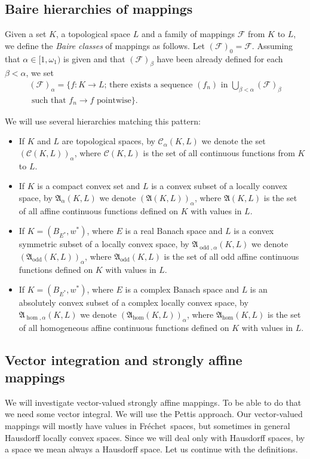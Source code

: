 \documentclass{amsart}
\numberwithin{equation}{section}
\theoremstyle{definition}
\def\fra{\mathfrak{A}}
\def\C{\mathcal C}
\def\F{\mathcal F}
\def\hom{\operatorname{hom}}
\def\odd{\operatorname{odd}}
\newcommand{\setsep}{;\,}
\newcommand{\fr}{Fr\'echet\ }
\begin{document}
\subsection{Baire hierarchies of mappings}\label{ssec:baire}

Given a set $K$, a topological space $L$ and a family of mappings $\F$ from $K$ to $L$, we define the \emph{Baire classes} of mappings as follows. Let $(\F)_0=\F$. Assuming  that $\alpha\in [1,\omega_1)$ is given and that $(\F)_\beta$ have
been already defined for each $\beta<\alpha$, we set
\begin{multline*}
(\F)_\alpha=\{f\colon K\to L\setsep \text{there exists a sequence } (f_n)\text{ in }\bigcup_{\beta<\alpha} (\F)_\beta
\\ \text{ such that }f_n\to f
\mbox{ pointwise}\}.
\end{multline*}

We will use several hierarchies matching this pattern:
\begin{itemize}
	\item If $K$ and $L$ are topological spaces, by $\C_\alpha(K,L)$ we denote the set $(\C(K,L))_\alpha$, where $\C(K,L)$ is the set of all continuous functions from $K$ to $L$.
	\item If $K$ is a compact convex set and $L$ is a convex subset of a locally convex space, by $\fra_\alpha(K,L)$ we denote $(\fra(K,L))_\alpha$, where $\fra(K,L)$ is the set of all affine continuous functions defined on $K$ with values in $L$.
	\item If $K=(B_{E^*},w^*)$, where $E$ is a real Banach space and $L$ is a convex symmetric subset of a  locally convex space, by $\fra_{\odd,\alpha}(K,L)$ we denote $(\fra_{\odd}(K,L))_\alpha$, where $\fra_{\odd} (K,L)$ is the set of all odd affine continuous functions defined on $K$ with values in $L$.
	\item If $K=(B_{E^*},w^*)$, where $E$ is a complex Banach space and $L$ is an absolutely convex subset of a complex locally convex space, by $\fra_{\hom,\alpha}(K,L)$ we denote $(\fra_{\hom}(K,L))_\alpha$, where $\fra_{\hom} (K,L)$ is the set of all homogeneous affine continuous functions defined on $K$ with values in $L$.
\end{itemize}


\subsection{Vector integration and strongly affine mappings}\label{ssec:pettis}
We will investigate vector-valued strongly affine mappings. To be able to do that we need some vector integral.
We will use the Pettis approach. Our vector-valued mappings  will mostly  have values in \fr spaces, but sometimes in general Hausdorff locally convex spaces. Since we will deal only with Hausdorff spaces, by a space we mean always a Hausdorff space.
Let us continue with the definitions.
\end{document}
